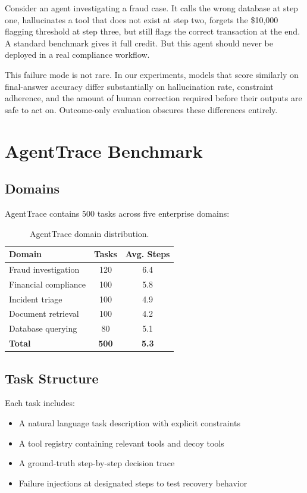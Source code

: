 \documentclass[11pt]{article}
\begin{document}
Consider an agent investigating a fraud case. It calls the wrong database at step one, hallucinates a tool that does not exist at step two, forgets the \$10,000 flagging threshold at step three, but still flags the correct transaction at the end. A standard benchmark gives it full credit. But this agent should never be deployed in a real compliance workflow.

This failure mode is not rare. In our experiments, models that score similarly on final-answer accuracy differ substantially on hallucination rate, constraint adherence, and the amount of human correction required before their outputs are safe to act on. Outcome-only evaluation obscures these differences entirely.

\section{AgentTrace Benchmark}

\subsection{Domains}

AgentTrace contains 500 tasks across five enterprise domains:

\begin{table}[h]
\centering
\caption{AgentTrace domain distribution.}
\begin{tabular}{lcc}
\toprule
\textbf{Domain} & \textbf{Tasks} & \textbf{Avg. Steps} \\
\midrule
Fraud investigation       & 120 & 6.4 \\
Financial compliance      & 100 & 5.8 \\
Incident triage           & 100 & 4.9 \\
Document retrieval        & 100 & 4.2 \\
Database querying         & 80  & 5.1 \\
\midrule
\textbf{Total}            & \textbf{500} & \textbf{5.3} \\
\bottomrule
\end{tabular}
\end{table}

\subsection{Task Structure}

Each task includes:
\begin{itemize}
    \item A natural language task description with explicit constraints
    \item A tool registry containing relevant tools and decoy tools
    \item A ground-truth step-by-step decision trace
    \item Failure injections at designated steps to test recovery behavior
\end{itemize}
\end{document}

